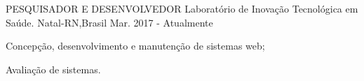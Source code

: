 

\begin{cventries}

  \cventry
    {PESQUISADOR E DESENVOLVEDOR} %
    {Laboratório de Inovação Tecnológica em Saúde.} %
    {Natal-RN,Brasil  } %
    {Mar. 2017 - Atualmente} %
    {
      \begin{cvitems} %
        \item {Concepção, desenvolvimento e manutenção de sistemas web;}
        \item {Avaliação de sistemas.}
      \end{cvitems}
    }

\end{cventries}
